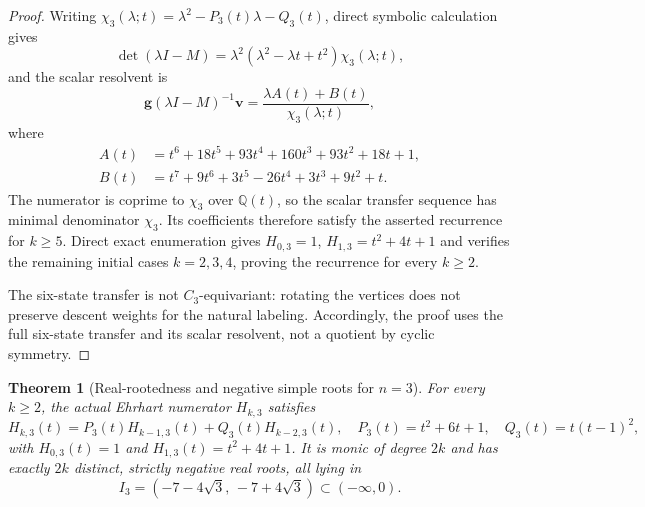 \documentclass[11pt,a4paper]{article}
\newtheorem{theorem}{Theorem}[section]
\theoremstyle{definition}
\begin{document}
\begin{proof}
Writing $\chi_3(\lambda;t)=\lambda^2-P_3(t)\lambda-Q_3(t)$, direct
symbolic calculation gives
\[
\det(\lambda I-M)=
\lambda^2(\lambda^2-\lambda t+t^2)\chi_3(\lambda;t),
\]
and the scalar resolvent is
\[
\mathbf g(\lambda I-M)^{-1}\mathbf v
=\frac{\lambda A(t)+B(t)}{\chi_3(\lambda;t)},
\]
where
\begin{align*}
A(t)&=t^6+18t^5+93t^4+160t^3+93t^2+18t+1,\\
B(t)&=t^7+9t^6+3t^5-26t^4+3t^3+9t^2+t.
\end{align*}
The numerator is coprime to $\chi_3$ over $\mathbb Q(t)$, so the scalar
transfer sequence has minimal denominator $\chi_3$. Its coefficients
therefore satisfy the asserted recurrence for $k\ge5$. Direct exact
enumeration gives $H_{0,3}=1$, $H_{1,3}=t^2+4t+1$ and verifies the
remaining initial cases $k=2,3,4$, proving the recurrence for every
$k\ge2$.

The six-state transfer is not $C_3$-equivariant: rotating the vertices
does not preserve descent weights for the natural labeling. Accordingly,
the proof uses the full six-state transfer and its scalar resolvent, not
a quotient by cyclic symmetry.
\end{proof}

\begin{theorem}[Real-rootedness and negative simple roots for $n=3$]
\label{thm:n3-real-rooted}
For every $k\ge2$, the actual Ehrhart numerator $H_{k,3}$ satisfies
\[
H_{k,3}(t)=P_3(t)H_{k-1,3}(t)+Q_3(t)H_{k-2,3}(t),
\quad
P_3(t)=t^2+6t+1,\quad Q_3(t)=t(t-1)^2,
\]
with $H_{0,3}(t)=1$ and $H_{1,3}(t)=t^2+4t+1$. It is monic of degree
$2k$ and has exactly $2k$ distinct, strictly negative real roots, all
lying in
\[
I_3=(-7-4\sqrt3,\,-7+4\sqrt3)\subset(-\infty,0).
\]
\end{theorem}
\end{document}
